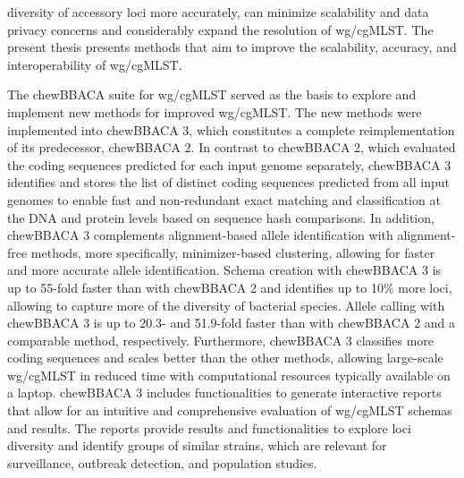 diversity of accessory loci more accurately, can minimize scalability and data privacy concerns and considerably expand the resolution of wg/cgMLST. The present thesis presents methods that aim to improve the scalability, accuracy, and interoperability of wg/cgMLST.

The chewBBACA suite for wg/cgMLST served as the basis to explore and implement new methods for improved wg/cgMLST. The new methods were implemented into chewBBACA 3, which constitutes a complete reimplementation of its predecessor, chewBBACA 2. In contrast to chewBBACA 2, which evaluated the coding sequences predicted for each input genome separately, chewBBACA 3 identifies and stores the list of distinct coding sequences predicted from all input genomes to enable fast and non-redundant exact matching and classification at the DNA and protein levels based on sequence hash comparisons. In addition, chewBBACA 3 complements alignment-based allele identification with alignment-free methods, more specifically, minimizer-based clustering, allowing for faster and more accurate allele identification. Schema creation with chewBBACA 3 is up to 55-fold faster than with chewBBACA 2 and identifies up to 10\% more loci, allowing to capture more of the diversity of bacterial species. Allele calling with chewBBACA 3 is up to 20.3- and 51.9-fold faster than with chewBBACA 2 and a comparable method, respectively. Furthermore, chewBBACA 3 classifies more coding sequences and scales better than the other methods, allowing large-scale wg/cgMLST in reduced time with computational resources typically available on a laptop. chewBBACA 3 includes functionalities to generate interactive reports that allow for an intuitive and comprehensive evaluation of wg/cgMLST schemas and results. The reports provide results and functionalities to explore loci diversity and identify groups of similar strains, which are relevant for surveillance, outbreak detection, and population studies.

